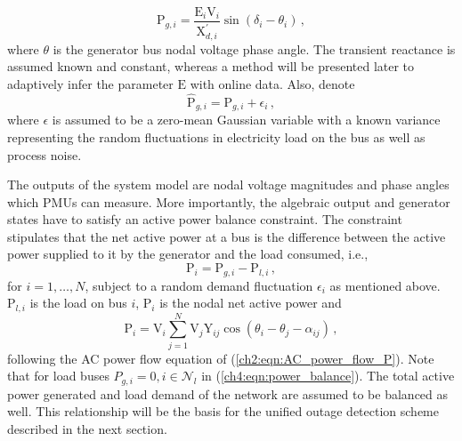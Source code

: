 \begin{equation}
\label{ch4:eqn:ae_continuous}
\text{P}_{g, i} = \frac{\text{E}_i\text{V}_i}{\text{X}_{d, i}^{'}}\sin (\delta_i - \theta_i)\,,
\end{equation}
where $\theta$ is the generator bus nodal voltage phase angle. The transient reactance is assumed known and constant, whereas a method will be presented later to adaptively infer the parameter $\text{E}$ with online data. Also, denote 
$$
\hat{\text{P}}_{g, i} = \text{P}_{g, i} + \epsilon_i \,,
$$
where $\epsilon$ is assumed to be a zero-mean Gaussian variable with a known variance representing the random fluctuations in electricity load on the bus as well as process noise. 

The outputs of the system model are nodal voltage magnitudes and phase angles which PMUs can measure. More importantly, the algebraic output and generator states have to satisfy an active power balance constraint. The constraint stipulates that the net active power at a bus is the difference between the active power supplied to it by the generator and the load consumed, i.e.,
\begin{equation}
\label{ch4:eqn:power_balance}
\text{P}_i = \text{P}_{g, i} - \text{P}_{l, i} \,,
\end{equation}
for $i = 1, \dots, N$, subject to a random demand fluctuation $\epsilon_i$ as mentioned above. $\text{P}_{l, i}$ is the load on bus $i$, $\text{P}_{i}$ is the nodal net active power and 
\begin{equation}
\label{ch4:eqn:ac_pf}
\text{P}_{i} = \text{V}_i \sum_{j=1}^{N} \text{V}_j \text{Y}_{ij} \cos (\theta_i - \theta_j - \alpha_{ij}) \,,
\end{equation} following the AC power flow equation of (\ref{ch2:eqn:AC_power_flow_P}). Note that for load buses ${P}_{g, i} = 0, i \in \mathcal{N}_l$ in (\ref{ch4:eqn:power_balance}). The total active power generated and load demand of the network are assumed to be balanced as well. This relationship will be the basis for the unified outage detection scheme described in the next section. 

